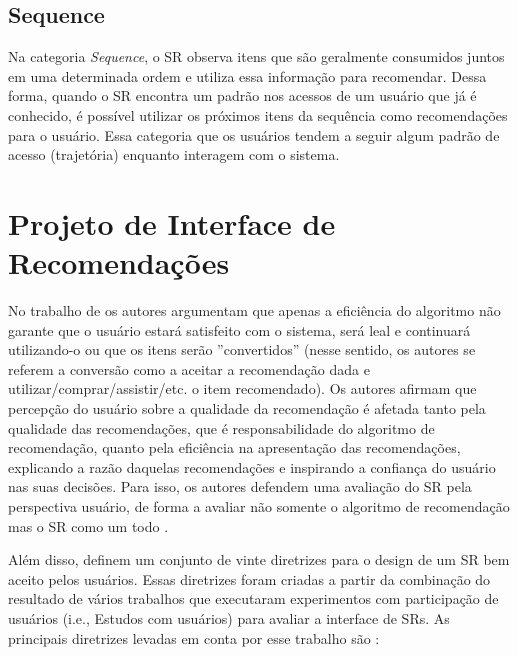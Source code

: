 \subsection{Sequence}\label{subsection:sequence}

Na categoria \textit{Sequence}, o SR observa itens que são geralmente consumidos juntos em uma determinada ordem e utiliza essa
informação para recomendar. Dessa forma, quando o SR encontra um padrão nos acessos de um usuário que já é conhecido,
é possível utilizar os próximos itens da sequência como recomendações para o usuário. Essa categoria que os usuários
tendem a seguir algum padrão de acesso (trajetória) enquanto interagem com o sistema.

\section{Projeto de Interface de Recomendações}\label{section:fundamentacao-apresentacao-recomendacao}

No trabalho de  os autores argumentam que apenas a eficiência do algoritmo não garante
que o usuário estará satisfeito com o sistema, será leal e continuará utilizando-o ou que os itens serão ''convertidos''
(nesse sentido, os autores se referem a conversão como a aceitar a recomendação dada e utilizar/comprar/assistir/etc.
o item recomendado). Os autores afirmam que percepção do usuário sobre a qualidade da recomendação é afetada tanto pela
qualidade das recomendações, que é responsabilidade do algoritmo de recomendação, quanto pela eficiência na apresentação
das recomendações, explicando a razão daquelas recomendações e inspirando a confiança do usuário nas suas decisões.
Para isso, os autores defendem uma avaliação do SR pela perspectiva usuário, de forma a avaliar não somente o algoritmo de
recomendação mas o SR como um todo \cite{pu2012evaluating}.

Além disso,  definem um conjunto de vinte diretrizes para o design de um SR bem aceito
pelos usuários. Essas diretrizes foram criadas a partir da combinação do resultado de vários trabalhos que executaram
experimentos com participação de usuários (i.e., Estudos com usuários) para avaliar a interface de SRs. As principais
diretrizes levadas em conta por esse trabalho são \cite{pu2012evaluating}:

